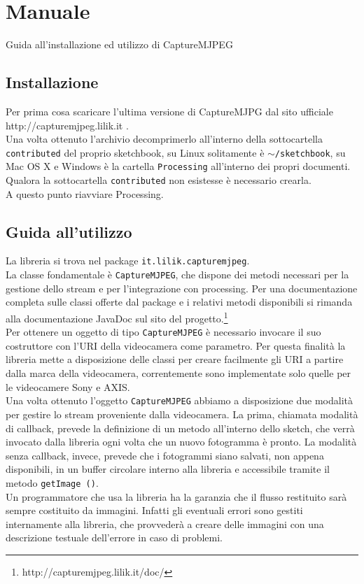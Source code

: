 \documentclass[a4paper,11pt]{article}
\begin{document}
\section{Manuale}
\label{sec:manuale}
Guida all'installazione ed utilizzo di CaptureMJPEG
\subsection{Installazione}
\label{sec:installazione}
Per prima cosa scaricare l'ultima versione di CaptureMJPG dal sito
ufficiale http://capturemjpeg.lilik.it .\\
Una volta ottenuto l'archivio decomprimerlo all'interno della
sottocartella \texttt{contributed} del proprio sketchbook, su Linux
solitamente è \texttt{$\sim$/sketchbook}, su Mac OS X e Windows
è la cartella \texttt{Processing} all'interno dei propri documenti.\\
Qualora la sottocartella \texttt{contributed} non esistesse è
necessario crearla.\\
A questo punto riavviare Processing. 
\subsection{Guida all'utilizzo}
\label{sec:guida}
La libreria si trova nel package \texttt{it.lilik.capturemjpeg}.\\
La classe fondamentale \`e \texttt{CaptureMJPEG}, che dispone dei metodi
necessari per la gestione dello stream e per l'integrazione con processing.
Per una documentazione completa sulle classi offerte dal package e i relativi
metodi disponibili si rimanda alla documentazione JavaDoc sul sito del 
progetto.\footnote{http://capturemjpeg.lilik.it/doc/}\\

Per ottenere un oggetto di tipo \texttt{CaptureMJPEG} \`e necessario invocare
il suo costruttore con l'URI della videocamera come parametro. Per questa
finalit\`a la libreria mette a disposizione delle classi per creare facilmente
gli URI a partire dalla marca della videocamera, correntemente sono
implementate solo quelle per le videocamere Sony e AXIS.\\
Una volta ottenuto l'oggetto \texttt{CaptureMJPEG} abbiamo a disposizione due
modalit\`a per gestire lo stream proveniente dalla videocamera. La prima,
chiamata modalit\`a di callback, prevede la definizione di un metodo
all'interno dello sketch, che verr\`a invocato dalla libreria ogni volta che
un nuovo fotogramma \`e pronto. La modalit\`a senza callback, invece, prevede
che i fotogrammi siano salvati, non appena disponibili, in un buffer circolare
interno alla libreria e accessibile tramite il metodo \texttt{getImage ()}.\\
Un programmatore che usa la libreria ha la garanzia che il flusso restituito
sar\`a sempre costituito da immagini. Infatti gli eventuali errori sono gestiti
internamente alla libreria, che provveder\`a a creare delle immagini con una
descrizione testuale dell'errore in caso di problemi.
\end{document}
